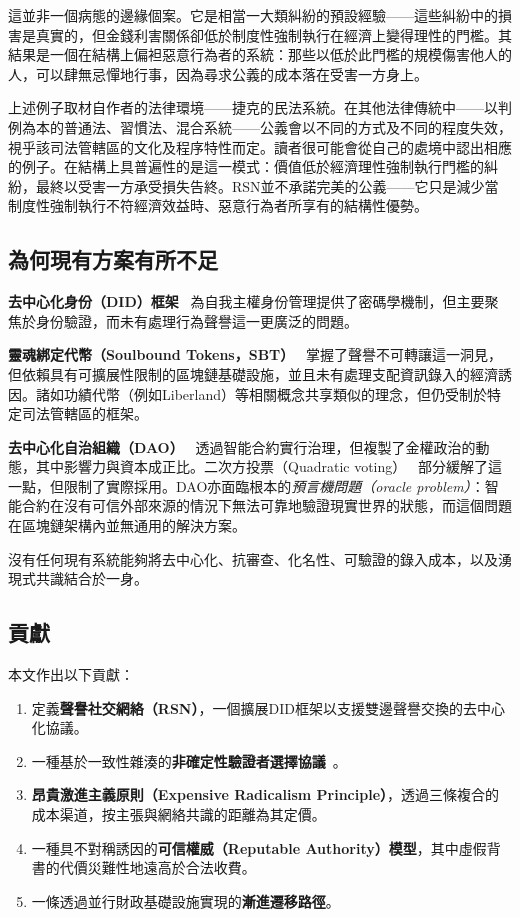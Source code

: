\documentclass[11pt,a4paper,twocolumn]{article}
\begin{document}
這並非一個病態的邊緣個案。它是相當一大類糾紛的預設經驗——這些糾紛中的損害是真實的，但金錢利害關係卻低於制度性強制執行在經濟上變得理性的門檻。其結果是一個在結構上偏袒惡意行為者的系統：那些以低於此門檻的規模傷害他人的人，可以肆無忌憚地行事，因為尋求公義的成本落在受害一方身上。

上述例子取材自作者的法律環境——捷克的民法系統。在其他法律傳統中——以判例為本的普通法、習慣法、混合系統——公義會以不同的方式及不同的程度失效，視乎該司法管轄區的文化及程序特性而定。讀者很可能會從自己的處境中認出相應的例子。在結構上具普遍性的是這一模式：價值低於經濟理性強制執行門檻的糾紛，最終以受害一方承受損失告終。RSN並不承諾完美的公義——它只是減少當制度性強制執行不符經濟效益時、惡意行為者所享有的結構性優勢。

\subsection{為何現有方案有所不足}

\textbf{去中心化身份（DID）框架}~\cite{did2022} 為自我主權身份管理提供了密碼學機制，但主要聚焦於身份驗證，而未有處理行為聲譽這一更廣泛的問題。

\textbf{靈魂綁定代幣（Soulbound Tokens，SBT）}~\cite{weyl2022} 掌握了聲譽不可轉讓這一洞見，但依賴具有可擴展性限制的區塊鏈基礎設施，並且未有處理支配資訊錄入的經濟誘因。諸如功績代幣（例如Liberland）等相關概念共享類似的理念，但仍受制於特定司法管轄區的框架。

\textbf{去中心化自治組織（DAO）}~\cite{buterin2014} 透過智能合約實行治理，但複製了金權政治的動態，其中影響力與資本成正比。二次方投票（Quadratic voting）~\cite{buterin2019} 部分緩解了這一點，但限制了實際採用。DAO亦面臨根本的\emph{預言機問題（oracle problem）}：智能合約在沒有可信外部來源的情況下無法可靠地驗證現實世界的狀態，而這個問題在區塊鏈架構內並無通用的解決方案。

沒有任何現有系統能夠將去中心化、抗審查、化名性、可驗證的錄入成本，以及湧現式共識結合於一身。

\subsection{貢獻}

本文作出以下貢獻：
\begin{enumerate}[nosep]
\item 定義\textbf{聲譽社交網絡（RSN）}，一個擴展DID框架以支援雙邊聲譽交換的去中心化協議。
\item 一種基於一致性雜湊的\textbf{非確定性驗證者選擇協議}~\cite{karger1997}。
\item \textbf{昂貴激進主義原則（Expensive Radicalism Principle）}，透過三條複合的成本渠道，按主張與網絡共識的距離為其定價。
\item 一種具不對稱誘因的\textbf{可信權威（Reputable Authority）模型}，其中虛假背書的代價災難性地遠高於合法收費。
\item 一條透過並行財政基礎設施實現的\textbf{漸進遷移路徑}。
\end{enumerate}
\end{document}
